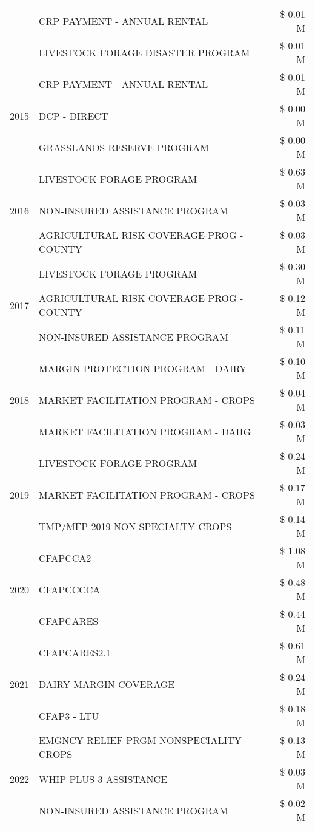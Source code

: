 \begin{tabular}{llr}
 & CRP PAYMENT - ANNUAL RENTAL & \$ 0.01 M \\
 & LIVESTOCK FORAGE DISASTER PROGRAM & \$ 0.01 M \\
\cline{1-3}
\multirow[t]{3}{*}{2015} & CRP PAYMENT - ANNUAL RENTAL & \$ 0.01 M \\
 & DCP - DIRECT & \$ 0.00 M \\
 & GRASSLANDS RESERVE PROGRAM & \$ 0.00 M \\
\cline{1-3}
\multirow[t]{3}{*}{2016} & LIVESTOCK FORAGE PROGRAM & \$ 0.63 M \\
 & NON-INSURED ASSISTANCE PROGRAM & \$ 0.03 M \\
 & AGRICULTURAL RISK COVERAGE PROG - COUNTY & \$ 0.03 M \\
\cline{1-3}
\multirow[t]{3}{*}{2017} & LIVESTOCK FORAGE PROGRAM & \$ 0.30 M \\
 & AGRICULTURAL RISK COVERAGE PROG - COUNTY & \$ 0.12 M \\
 & NON-INSURED ASSISTANCE PROGRAM & \$ 0.11 M \\
\cline{1-3}
\multirow[t]{3}{*}{2018} & MARGIN PROTECTION PROGRAM - DAIRY & \$ 0.10 M \\
 & MARKET FACILITATION PROGRAM - CROPS & \$ 0.04 M \\
 & MARKET FACILITATION PROGRAM - DAHG & \$ 0.03 M \\
\cline{1-3}
\multirow[t]{3}{*}{2019} & LIVESTOCK FORAGE PROGRAM & \$ 0.24 M \\
 & MARKET FACILITATION PROGRAM - CROPS & \$ 0.17 M \\
 & TMP/MFP 2019 NON SPECIALTY CROPS & \$ 0.14 M \\
\cline{1-3}
\multirow[t]{3}{*}{2020} & CFAPCCA2 & \$ 1.08 M \\
 & CFAPCCCCA & \$ 0.48 M \\
 & CFAPCARES & \$ 0.44 M \\
\cline{1-3}
\multirow[t]{3}{*}{2021} & CFAPCARES2.1 & \$ 0.61 M \\
 & DAIRY MARGIN COVERAGE & \$ 0.24 M \\
 & CFAP3 - LTU & \$ 0.18 M \\
\cline{1-3}
\multirow[t]{3}{*}{2022} & EMGNCY RELIEF PRGM-NONSPECIALITY CROPS & \$ 0.13 M \\
 & WHIP PLUS 3 ASSISTANCE & \$ 0.03 M \\
 & NON-INSURED ASSISTANCE PROGRAM & \$ 0.02 M \\
\cline{1-3}
\bottomrule
\end{tabular}
